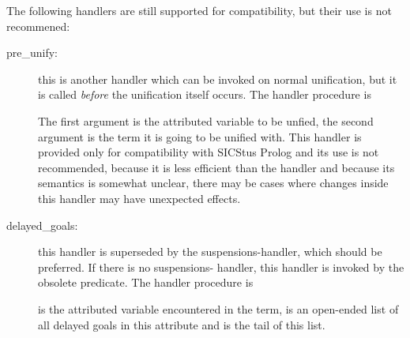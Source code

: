 The following handlers are still supported for compatibility,
but their use is not recommened:
\begin{description}
\item [pre_unify:]
  this is another handler which can be invoked on
normal unification, but it is called \emph{before} the unification
itself occurs.
The handler procedure is
\begin{quote}
\end{quote}
The first argument is the attributed variable to be unfied,
the second argument is the term it is going to be unified with.
This handler is provided only for compatibility with SICStus Prolog
and its use is not recommended, because it is less efficient
than the  handler and because its semantics is somewhat
unclear, there may be cases where changes inside this handler
may have unexpected effects.

\item [delayed_goals:]
  this handler is superseded by the
suspensions-handler, which should be preferred. If there is no suspensions-
handler, this handler is invoked by the obsolete
predicate.
The handler procedure is
\begin{quote}
\end{quote}
 is the attributed variable encountered in the
term,  is an open-ended list of all delayed
goals in this attribute and  is the
tail of this list.

\end{description}

